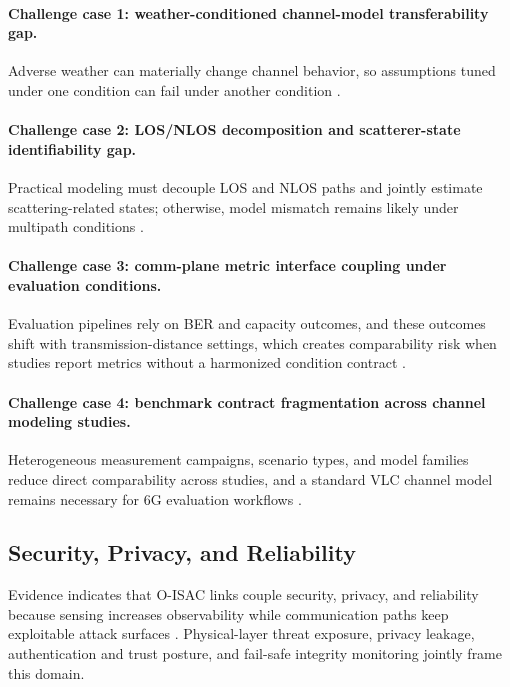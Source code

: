 \paragraph{Challenge case 1: weather-conditioned channel-model transferability gap.}
Adverse weather can materially change channel behavior, so assumptions tuned under one condition can fail under another condition \cite{O_ISAC_005}.

\paragraph{Challenge case 2: LOS/NLOS decomposition and scatterer-state identifiability gap.}
Practical modeling must decouple LOS and NLOS paths and jointly estimate scattering-related states; otherwise, model mismatch remains likely under multipath conditions \cite{O_ISAC_050}.

\paragraph{Challenge case 3: comm-plane metric interface coupling under evaluation conditions.}
Evaluation pipelines rely on BER and capacity outcomes, and these outcomes shift with transmission-distance settings, which creates comparability risk when studies report metrics without a harmonized condition contract \cite{O_ISAC_381}.

\paragraph{Challenge case 4: benchmark contract fragmentation across channel modeling studies.}
Heterogeneous measurement campaigns, scenario types, and model families reduce direct comparability across studies, and a standard VLC channel model remains necessary for 6G evaluation workflows \cite{O_ISAC_327}.

\subsection{Security, Privacy, and Reliability}

Evidence indicates that O-ISAC links couple security, privacy, and reliability because sensing increases observability while communication paths keep exploitable attack surfaces \cite{O_ISAC_145,O_ISAC_039,O_ISAC_156,O_ISAC_041}. Physical-layer threat exposure, privacy leakage, authentication and trust posture, and fail-safe integrity monitoring jointly frame this domain.

